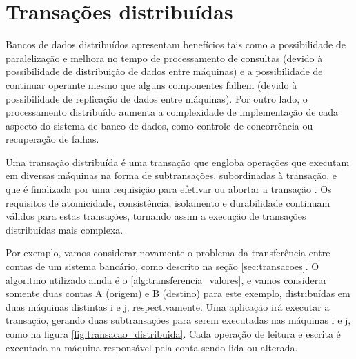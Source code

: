 \documentclass[11pt,twoside,a4paper]{book}
\begin{document}

\section{Transações distribuídas}
\label{sec:transacoes_distribuidas}
Bancos de dados distribuídos apresentam benefícios tais como a possibilidade de paralelização e melhora no tempo de processamento de consultas (devido à possibilidade de distribuição de dados entre máquinas) e a possibilidade de continuar operante mesmo que alguns componentes falhem (devido à possibilidade de replicação de dados entre máquinas). Por outro lado, o processamento distribuído aumenta a complexidade de implementação de cada aspecto do sistema de banco de dados, como controle de concorrência ou recuperação de falhas.

Uma transação distribuída é uma transação que engloba operações que executam em diversas máquinas na forma de subtransações, subordinadas à transação, e que é finalizada por uma requisição para efetivar ou abortar a transação \cite{gray-lamport}. Os requisitos de atomicidade, consistência, isolamento e durabilidade continuam válidos para estas transações, tornando assim a execução de transações distribuídas mais complexa.

Por exemplo, vamos considerar novamente o problema da transferência entre contas de um sistema bancário, como descrito na seção \ref{sec:transacoes}. O algoritmo utilizado ainda é o \ref{alg:transferencia_valores}, e vamos considerar somente duas contas A (origem) e B (destino) para este exemplo, distribuídas em duas máquinas distintas i e j, respectivamente. Uma aplicação irá executar a transação, gerando duas subtransações para serem executadas nas máquinas i e j, como na figura \ref{fig:transacao_distribuida}. Cada operação de leitura e escrita é executada na máquina responsável pela conta sendo lida ou alterada. 

\end{document}

